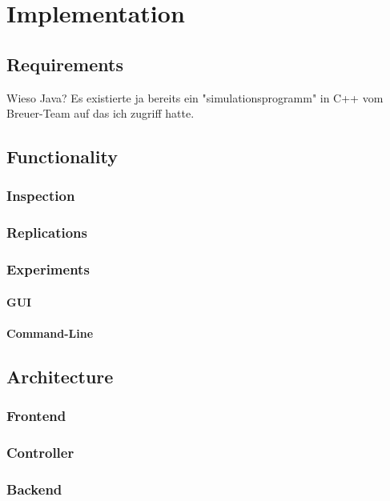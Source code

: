 \documentclass[Bachelorarbeit.tex]{subfiles}
\begin{document}
\chapter{Implementation}
\label{ch:implementation}

\section{Requirements}
Wieso Java? Es existierte ja bereits ein "simulationsprogramm" in C++ vom Breuer-Team auf das ich zugriff hatte.

\section{Functionality}

\subsection{Inspection}

\subsection{Replications}

\subsection{Experiments}
\subsubsection{GUI}
\subsubsection{Command-Line}

\section{Architecture}
\subsection{Frontend}
\subsection{Controller}
\subsection{Backend}
\end{document}

